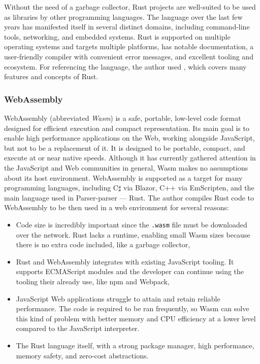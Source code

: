 \documentclass[english,engineering]{wizthesis}
\newcommand{\paraphrase}[1]{#1}
\newcommand{\thisproject}{Parser-parser}
\begin{document}
Without the need of a garbage collector, Rust projects are well-suited to be
used as libraries by other programming languages. The language over the last few
years has manifested itself in several distinct domains, including command-line
tools, networking, and embedded systems. Rust is supported on multiple operating
systems and targets multiple platforms, has notable documentation, a
user-friendly compiler with convenient error messages, and excellent tooling and
ecosystem. For referencing the language, the author used \cite{klabnik-2018},
which covers many features and concepts of Rust.

\subsubsection*{WebAssembly}

WebAssembly \cite{webassembly} (abbreviated \emph{Wasm}) is a safe, portable,
low-level code format designed for efficient execution and compact
representation. Its main goal is to enable high performance applications on the
Web, working alongside JavaScript, but not to be a replacement of it.
\paraphrase{It is designed to be portable, compact, and execute at or near
native speeds. Although it has currently gathered attention in the JavaScript
and Web communities in general, Wasm makes no assumptions about its host
environment.} WebAssembly is supported as a target for many programming
languages, including C$\sharp$ via Blazor, C++ via EmScripten, and the main
language used in \thisproject{} --- Rust. The author compiles Rust code to
WebAssembly to be then used in a web environment for several reasons:
\begin{itemize}
  \item \paraphrase{Code size is incredibly important since the \texttt{.wasm}
  file must be downloaded over the network. Rust lacks a runtime, enabling small
  Wasm sizes because there is no extra code included, like a garbage collector},
  \item \paraphrase{Rust and WebAssembly integrates with existing JavaScript
  tooling. It supports ECMAScript modules and the developer can continue using
  the tooling their already use, like npm and Webpack},
  \item \paraphrase{JavaScript Web applications struggle to attain and retain
  reliable performance.} The code is required to be ran frequently, so Wasm can
  solve this kind of problem \paraphrase{with better memory and CPU efficiency
  at a lower level compared to the JavaScript interpreter}.
  \item The Rust language itself, with a strong package manager, high
  performance, memory safety, and zero-cost abstractions.
\end{itemize}
\end{document}

